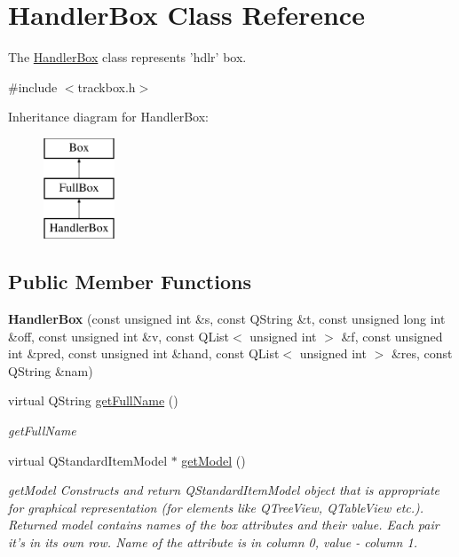 \hypertarget{class_handler_box}{\section{Handler\-Box Class Reference}
\label{class_handler_box}
}


The \hyperlink{class_handler_box}{Handler\-Box} class represents 'hdlr' box.  




{\ttfamily \#include $<$trackbox.\-h$>$}

Inheritance diagram for Handler\-Box\-:\begin{figure}[H]
\begin{center}
\leavevmode
\includegraphics[height=3.000000cm]{class_handler_box}
\end{center}
\end{figure}
\subsection*{Public Member Functions}
\begin{DoxyCompactItemize}
\item 
\hypertarget{class_handler_box_ad1069caa75de739c4499ff77418fffb8}{{\bfseries Handler\-Box} (const unsigned int \&s, const Q\-String \&t, const unsigned long int \&off, const unsigned int \&v, const Q\-List$<$ unsigned int $>$ \&f, const unsigned int \&pred, const unsigned int \&hand, const Q\-List$<$ unsigned int $>$ \&res, const Q\-String \&nam)}\label{class_handler_box_ad1069caa75de739c4499ff77418fffb8}

\item 
virtual Q\-String \hyperlink{class_handler_box_a77b90ca0801113aed5f6272035da0a04}{get\-Full\-Name} ()
\begin{DoxyCompactList}\small\item\em get\-Full\-Name \end{DoxyCompactList}\item 
virtual Q\-Standard\-Item\-Model $\ast$ \hyperlink{class_handler_box_a3d0550ec682df1ea81856082f431bc28}{get\-Model} ()
\begin{DoxyCompactList}\small\item\em get\-Model Constructs and return Q\-Standard\-Item\-Model object that is appropriate for graphical representation (for elements like Q\-Tree\-View, Q\-Table\-View etc.). Returned model contains names of the box attributes and their value. Each pair it's in its own row. Name of the attribute is in column 0, value -\/ column 1. \end{DoxyCompactList}\end{DoxyCompactItemize}
